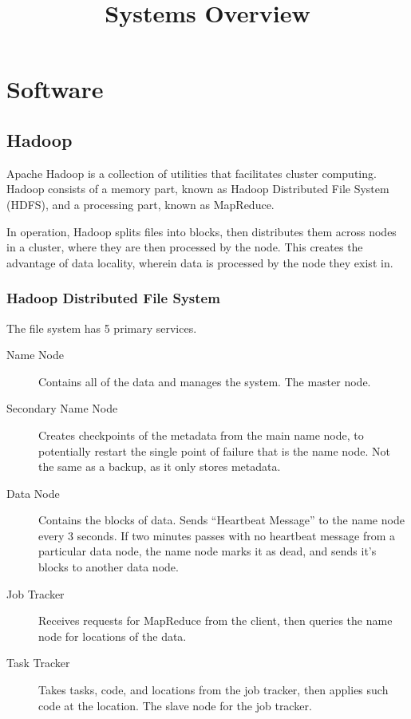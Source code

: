 \documentclass[10pt,a4paper]{article}
\begin{document}
\title{Systems Overview}
\maketitle{}

\section{Software}
\label{sec:software}

\subsection{Hadoop}
\label{sec:hadoop-1}

Apache Hadoop is a collection of utilities that facilitates cluster
computing. Hadoop consists of a memory part, known as Hadoop
Distributed File System (HDFS), and a processing part, known as MapReduce.

In operation, Hadoop splits files into blocks, then distributes them
across nodes in a cluster, where they are then processed by the node.
This creates the advantage of data locality, wherein data is processed
by the node they exist in.

\subsubsection{Hadoop Distributed File System}
\label{sec:hdfs}

The file system has 5 primary services.

\begin{description}
\item[Name Node] Contains all of the data and manages the system. The
  master node.
  \item[Secondary Name Node] Creates checkpoints of the metadata from
  the main name node, to potentially restart the single point of
  failure that is the name node. Not the same as a backup, as it only
  stores metadata.
\item[Data Node] Contains the blocks of data. Sends ``Heartbeat
  Message'' to the name node every 3 seconds. If two minutes passes
  with no heartbeat message from a particular data node, the name node
  marks it as dead, and sends it's blocks to another data node.
\item[Job Tracker] Receives requests for MapReduce from the client,
  then queries the name node for locations of the data.
\item[Task Tracker] Takes tasks, code, and locations from the job
  tracker, then applies such code at the location. The slave node for
  the job tracker.
\end{description}
\end{document}
